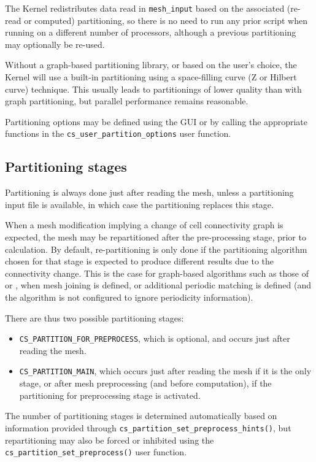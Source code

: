 {{{The Kernel redistributes data read in {\tt mesh\_input} based on the associated
(re-read or computed) partitioning, so there is no need to run any
prior script when running on a different number of processors, although
a previous partitioning may optionally be re-used.

Without a graph-based partitioning library, or based on the user's choice,
the Kernel will use a built-in partitioning using a space-filling curve
(Z or Hilbert curve) technique. This usually leads to partitionings
of lower quality than with graph partitioning, but parallel
performance remains reasonable.

Partitioning options may be defined using the GUI or by calling
the appropriate functions in the
\texttt{cs\_user\_partition\_options} user function.

\subsection{Partitioning stages\label{sec:parall:part:stages}}

Partitioning is always done just after reading the mesh, unless a
partitioning input file is available, in which case the partitioning
replaces this stage.

When a mesh modification implying a change of cell connectivity graph
is expected, the mesh may be repartitioned after the pre-processing
stage, prior to calculation. By default, re-partitioning is only done
if the partitioning algorithm chosen for that stage is expected to
produce different results due to the connectivity change. This is
the case for graph-based algorithms such as those of \metis or \scotch,
when mesh joining is defined, or additional periodic matching is defined
(and the algorithm is not configured to ignore periodicity information).

There are thus two possible partitioning stages:

\begin{itemize}
\item \texttt{CS\_PARTITION\_FOR\_PREPROCESS}, which is optional, and
      occurs just  after reading the mesh.
\item \texttt{CS\_PARTITION\_MAIN}, which occurs just after reading the
      mesh if it is the only stage, or after mesh preprocessing (and
      before computation), if the partitioning for preprocessing stage
      is activated.
\end{itemize}

The number of partitioning stages is determined automatically based on
information provided through \texttt{cs\_partition\_set\_preprocess\_hints()},
but repartitioning may also be forced or inhibited using the
\texttt{cs\_partition\_set\_preprocess()} user function.

}}}
